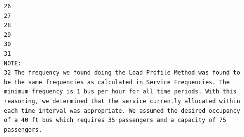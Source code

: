 \documentclass[
11pt, %
oneside, %
english, %
singlespacing, %
]{macthesis} %
\begin{document}
\begin{verbatim}
26                                                                                                                                                                                                                                                                                                                                                                                                                               
27                                                                                                                                                                                                                                                                                                                                                                                                                               
28                                                                                                                                                                                                                                                                                                                                                                                                                               
29                                                                                                                                                                                                                                                                                                                                                                                                                               
30                                                                                                                                                                                                                                                                                                                                                                                                                               
31                                                                                                                                                                                                                                                                                                                                                                                                                          NOTE:
32 The frequency we found doing the Load Profile Method was found to be the same frequencies as calculated in Service Frequencies. The minimum frequency is 1 bus per hour for all time periods. With this reasoning, we determined that the service currently allocated within each time interval was appropriate. We assumed the desired occupancy of a 40 ft bus which requires 35 passengers and a capacity of 75 passengers.

\end{verbatim}
\end{document}
